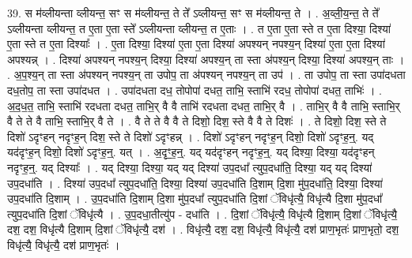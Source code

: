 \documentclass[17pt]{extarticle}
\begin{document}
39. स म॑व्लीयन्ता व्लीयन्त॒ सꣳ स म॑व्लीयन्त॒ ते ते᳚ ऽव्लीयन्त॒ सꣳ स म॑व्लीयन्त॒ ते । . अ॒व्ली॒य॒न्त॒ ते ते᳚ ऽव्लीयन्ता व्लीयन्त॒ त ए॒ता ए॒ता स्ते᳚ ऽव्लीयन्ता व्लीयन्त॒ त ए॒ताः । . त ए॒ता ए॒ता स्ते त ए॒ता दिश्या॒ दिश्या॑ ए॒ता स्ते त ए॒ता दिश्याः᳚ । . ए॒ता दिश्या॒ दिश्या॑ ए॒ता ए॒ता दिश्या॑ अपश्यन् नपश्य॒न् दिश्या॑ ए॒ता ए॒ता दिश्या॑ अपश्यन्न् । . दिश्या॑ अपश्यन् नपश्य॒न् दिश्या॒ दिश्या॑ अपश्य॒न् ता स्ता अ॑पश्य॒न् दिश्या॒ दिश्या॑ अपश्य॒न् ताः । . अ॒प॒श्य॒न् ता स्ता अ॑पश्यन् नपश्य॒न् ता उपोप॒ ता अ॑पश्यन् नपश्य॒न् ता उप॑ । . ता उपोप॒ ता स्ता उपा॑दधता दध॒तोप॒ ता स्ता उपा॑दधत । . उपा॑दधता दध॒ तोपोपा॑ दधत॒ ताभि॒ स्ताभि॑ रदध॒ तोपोपा॑ दधत॒ ताभिः॑ । . अ॒द॒ध॒त॒ ताभि॒ स्ताभि॑ रदधता दधत॒ ताभि॒र् वै वै ताभि॑ रदधता दधत॒ ताभि॒र् वै । . ताभि॒र् वै वै ताभि॒ स्ताभि॒र् वै ते ते वै ताभि॒ स्ताभि॒र् वै ते । . वै ते ते वै वै ते दिशो॒ दिश॒ स्ते वै वै ते दिशः॑ । . ते दिशो॒ दिश॒ स्ते ते दिशो॑ ऽदृꣳहन् नदृꣳह॒न् दिश॒ स्ते ते दिशो॑ ऽदृꣳहन्न् । . दिशो॑ ऽदृꣳहन् नदृꣳह॒न् दिशो॒ दिशो॑ ऽदृꣳह॒न्॒. यद् यद॑दृꣳह॒न् दिशो॒ दिशो॑ ऽदृꣳह॒न्॒. यत् । . अ॒दृꣳ॒॒ह॒न्॒. यद् यद॑दृꣳहन् नदृꣳह॒न्॒. यद् दिश्या॒ दिश्या॒ यद॑दृꣳहन् नदृꣳह॒न्॒. यद् दिश्याः᳚ । . यद् दिश्या॒ दिश्या॒ यद् यद् दिश्या॑ उप॒दधा᳚ त्युप॒दधा॑ति॒ दिश्या॒ यद् यद् दिश्या॑ उप॒दधा॑ति । . दिश्या॑ उप॒दधा᳚ त्युप॒दधा॑ति॒ दिश्या॒ दिश्या॑ उप॒दधा॑ति दि॒शाम् दि॒शा मु॑प॒दधा॑ति॒ दिश्या॒ दिश्या॑ उप॒दधा॑ति दि॒शाम् । . उ॒प॒दधा॑ति दि॒शाम् दि॒शा मु॑प॒दधा᳚ त्युप॒दधा॑ति दि॒शां ॅविधृ॑त्यै॒ विधृ॑त्यै दि॒शा मु॑प॒दधा᳚ त्युप॒दधा॑ति दि॒शां ॅविधृ॑त्यै । . उ॒प॒दधा॒तीत्यु॑प - दधा॑ति । . दि॒शां ॅविधृ॑त्यै॒ विधृ॑त्यै दि॒शाम् दि॒शां ॅविधृ॑त्यै॒ दश॒ दश॒ विधृ॑त्यै दि॒शाम् दि॒शां ॅविधृ॑त्यै॒ दश॑ । . विधृ॑त्यै॒ दश॒ दश॒ विधृ॑त्यै॒ विधृ॑त्यै॒ दश॑ प्राण॒भृतः॑ प्राण॒भृतो॒ दश॒ विधृ॑त्यै॒ विधृ॑त्यै॒ दश॑ प्राण॒भृतः॑ । \newline
\end{document}
